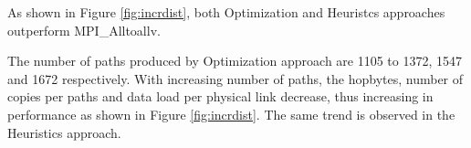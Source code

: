 As shown in Figure \ref{fig:incrdist}, both Optimization and Heuristcs approaches outperform MPI\_Alltoallv. 

The number of paths produced by Optimization approach are 1105 to 1372, 1547 and 1672 respectively. With increasing number of paths, the hopbytes, number of copies per paths and data load per physical link decrease, thus increasing in performance as shown in Figure \ref{fig:incrdist}. The same trend is observed in the Heuristics approach.
